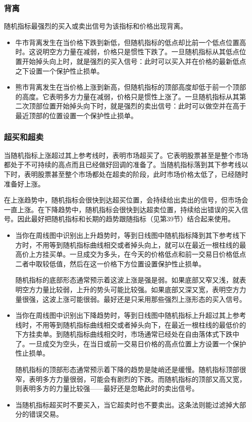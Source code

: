 \subsubsection*{背离}
随机指标最强烈的买入或卖出信号为该指标和价格出现背离。
\begin{itemize}
    \item 牛市背离发生在当价格下跌到新低，但随机指标的低点却比前一个低点位置高时。这说明空方力量在减弱，价格只是惯性下跌了。一旦随机指标从其低点位置开始掉头向上时，就是强烈的买入信号：此时可以买入并在价格的最新低点之下设置一个保护性止损单。

    \item 熊市背离发生在当价格上涨到新高，但随机指标的顶部高度却低于前一个顶部的高度。它表明多方力量在减弱，价格只是惯性上涨了。一旦随机指标从其第二次顶部位置开始掉头向下时，就是强烈的卖出信号：此时可以做空并在高于最近顶部的位置设置一个保护性止损单。
\end{itemize}
\subsubsection*{超买和超卖}
当随机指标上涨超过其上参考线时，表明市场超买了。它表明股票甚至是整个市场都处于不可持续的高点而且已经做好回调的准备了。当随机指标落到其下参考线以下时，表明股票甚至整个市场都处在超卖的阶段，此时市场价格太低了，已经随时准备好上涨。

在上涨趋势中，随机指标会很快到达超买位置，会持续给出卖出的信号，但市场会一直上涨。在下降趋势中，随机指标会很快到达超卖位置，持续给出错误的买入信号。因此最好把随机指标和长期的趋势跟随指标（见第39节）结合起来使用。

\begin{itemize}
    \item 当你在周线图中识别出上升趋势时，等到日线图中随机指标降到其下参考线下方时，不用等到随机指标曲线相交或者掉头向上，就可以在最近一根柱线的最高价上方挂买单。一旦成交为多头，在今天的价格低点和前一交易日价格低点二者中取较低值，然后在这一价格下方位置设置保护性止损单。

          随机指标的底部形态通常预示着这波上涨是强是弱。如果底部又窄又浅，就表明空方力量比较弱，上升的势头可能比较强。如果底部又深又宽，表明空方力量很强，这波上涨可能很弱。最好还是只采用那些强烈上涨形态的买入信号。
    \item 当你在周线图中识别出下降趋势时，等到日线图中随机指标上升超过其上参考线时，不用等到随机指标曲线相交或者掉头向下，在最近一根柱线的最低价的下方挂卖单。到随机指标曲线相交时，市场通常已经处在自由落体式下跌中了。一旦成交为空头，在当日或前一交易日价格的高点位置上方设置一个保护性止损单。

          随机指标的顶部形态通常预示着下降的趋势是陡峭还是缓慢。随机指标顶部很窄，表明多方力量很弱，可能会有剧烈的下跌。而随机指标的顶部又高又宽，则表明多方的力量比较强——最好还是忽略此时的卖出信号。
    \item 当随机指标超买时不要买入，当它超卖时也不要卖出。这条法则能过滤掉大部分的错误交易。
\end{itemize}
